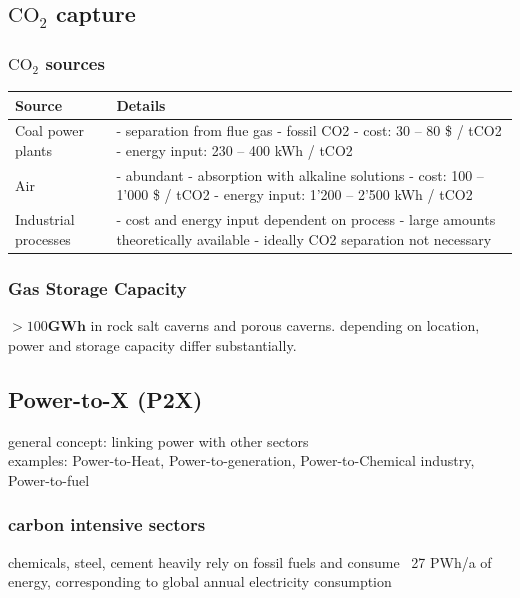 \documentclass[a4paper,10pt,landscape]{scrartcl}
\begin{document}
\begin{multicols*}{3}
\subsection{$\mathrm{CO_2}$ capture}
\subsubsection{$\mathrm{CO_2}$ sources}
\begin{tabular}{|p{1.2cm}|p{7.5cm}|}
\hline
\textbf{Source} & \textbf{Details} \\ \hline
Coal power plants & - separation from flue gas \newline
- fossil CO2 \newline
- cost: 30 – 80 \$ / tCO2 \newline
- energy input: 230 – 400 kWh / tCO2 \\ \hline
Air & - abundant \newline
- absorption with alkaline solutions \newline
- cost: 100 – 1'000 \$ / tCO2 \newline
- energy input: 1'200 – 2'500 kWh / tCO2 \\ \hline
Industrial processes & - cost and energy input dependent on process \newline
- large amounts theoretically available \newline
- ideally CO2 separation not necessary \\ \hline
\end{tabular}

\subsubsection{Gas Storage Capacity}
$>100\mathbf{GWh}$ in rock salt caverns and porous caverns. depending on location, power and storage capacity differ substantially.

\subsection{Power-to-X (P2X)}
general concept: linking power with other sectors \\
examples: Power-to-Heat, Power-to-generation, Power-to-Chemical industry, Power-to-fuel
\subsubsection{carbon intensive sectors}
chemicals, steel, cement heavily rely on fossil fuels and consume ~27 PWh/a of energy, corresponding to global annual electricity consumption

\end{multicols*}
\end{document}
